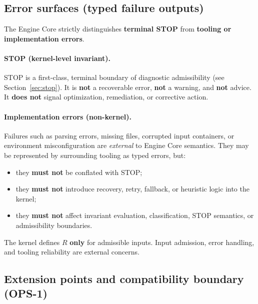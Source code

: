 \subsection{Error surfaces (typed failure outputs)}

The Engine Core strictly distinguishes \textbf{terminal STOP} from
\textbf{tooling or implementation errors}.

\paragraph{STOP (kernel-level invariant).}
STOP is a first-class, terminal boundary of diagnostic admissibility
(see Section~\ref{sec:stop}).
It is \textbf{not} a recoverable error, \textbf{not} a warning,
and \textbf{not} advice.
It \textbf{does not} signal optimization, remediation, or corrective action.

\paragraph{Implementation errors (non-kernel).}
Failures such as parsing errors, missing files, corrupted input containers,
or environment misconfiguration are \emph{external} to Engine Core semantics.
They may be represented by surrounding tooling as typed errors, but:
\begin{itemize}
  \item they \textbf{must not} be conflated with STOP;
  \item they \textbf{must not} introduce recovery, retry, fallback,
        or heuristic logic into the kernel;
  \item they \textbf{must not} affect invariant evaluation, classification,
        STOP semantics, or admissibility boundaries.
\end{itemize}

The kernel defines $R$ \textbf{only} for admissible inputs.
Input admission, error handling, and tooling reliability are external concerns.

\subsection{Extension points and compatibility boundary (OPS-1)}

